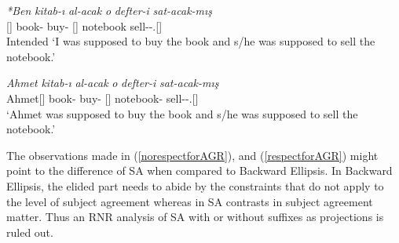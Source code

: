 \begin{exe}
    \ex \label{respectforAGR}
    \begin{xlist}
        \ex 
        \gll
        \textit{*Ben} \textit{kitab-ı} \textit{al-acak} \textit{o} \textit{defter-i} \textit{sat-acak-mış} \\ {\Fsg}[{\Nom}] book-{\Acc} buy-{\Fut} {\Tsg}[{\Nom}] notebook sell-{\Fut}-{\Cop}.{\Prf}[{\Tsg}] \\
        \glt Intended `I was supposed to buy the book and s/he was supposed to sell the notebook.'
        
        \ex 
        \gll 
        \textit{Ahmet} \textit{kitab-ı} \textit{al-acak} \textit{o} \textit{defter-i} \textit{sat-acak-mış} \\ Ahmet[{\Nom}] book-{\Acc} buy-{\Fut} {\Tsg}[{\Nom}] notebook-{\Acc} sell-{\Fut}-{\Cop}.{\Prf}[{\Tsg}] \\
        \glt `Ahmet was supposed to buy the book and s/he was supposed to sell the notebook.'
    \end{xlist}
\end{exe}

The observations made in (\ref{norespectforAGR}), and (\ref{respectforAGR}) might point to the difference of SA when compared to Backward Ellipsis. In Backward Ellipsis, the elided part needs to abide by the constraints that do not apply to the level of subject agreement whereas in SA contrasts in subject agreement matter. Thus an RNR analysis of SA with or without suffixes as projections is ruled out. 